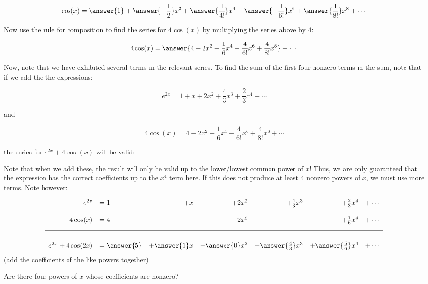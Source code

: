 \documentclass{ximera}
\begin{document}
\begin{exercise}
\begin{exercise}
\begin{exercise}
\[
\cos(x)= \answer{1}+\answer{-\frac{1}{2}}x^2+\answer{\frac{1}{4!}}x^4+\answer{-\frac{1}{6!}}x^6+\answer{\frac{1}{8!}}x^8 + \cdots
\]

\begin{exercise}
Now use the rule for composition to find the series for $4 \cos(x)$ by multiplying the series above by $4$:

\[
4 \cos(x) = \answer{4-2x^2+\frac{1}{6}x^4- \frac{4}{6!} x^6 +\frac{4}{8!}x^8}+ \cdots
\]

\end{exercise}
\end{exercise}
Now, note that we have exhibited several terms in the relevant series.  To find the sum of the first four nonzero terms in the sum, note that if we add the the expressions:

\[e^{2x} = 1+x+2x^2+\frac{4}{3}x^3+\frac{2}{3}x^4+ \cdots\]

and

\[ 4 \cos(x) = 4-2x^2+\frac{1}{6}x^4- \frac{4}{6!} x^6 +\frac{4}{8!}x^8+ \cdots \]

the series for $e^{2x}+4 \cos(x)$ will be valid:

\begin{multipleChoice}
\end{multipleChoice}

Note that when we add these, the result will only be valid up to the lower/lowest common power of $x$!  Thus, we are only guaranteed that the expression has the correct coefficients up to the $x^4$ term here.  If this does not produce at least $4$ nonzero powers of $x$, we must use more terms.  Note however:

\[ 
\begin{array}{rlrrrrr}
e^{2x} &= 1&+x&+2x^2&+\frac{4}{3}x^3&+\frac{2}{3}x^4&+ \cdots \\ [3ex]
4 \cos(x) &= 4& &-2x^2& &+\frac{1}{6}x^4& + \cdots \\[2ex]
\hline \\ [1ex]
e^{2x}+4\cos(2x) & = \answer{5}&+\answer{1}x&+\answer{0}x^2&+\answer{\frac{4}{3}}x^3&+\answer{\frac{5}{6}}x^4& +\cdots
\end{array}
\]
(add the coefficients of the like powers together)

Are there four powers of $x$ whose coefficients are nonzero?

\begin{multipleChoice}
\end{multipleChoice}


\end{exercise}
\end{exercise}
\end{document}
